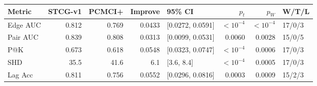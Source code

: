 \begin{tabular}{lrrrlrrl}
\toprule
Metric & STCG-v1 & PCMCI+ & Improve & 95\% CI & $p_t$ & $p_W$ & W/T/L \\
\midrule
Edge AUC & 0.812 & 0.769 & 0.0433 & [0.0272, 0.0591] & $<10^{-4}$ & $<10^{-4}$ & 17/0/3 \\
Pair AUC & 0.839 & 0.808 & 0.0313 & [0.0099, 0.0531] & 0.0060 & 0.0028 & 15/0/5 \\
P@K & 0.673 & 0.618 & 0.0548 & [0.0323, 0.0747] & $<10^{-4}$ & 0.0006 & 17/0/3 \\
SHD & 35.5 & 41.6 & 6.1 & [3.6, 8.4] & $<10^{-4}$ & 0.0005 & 17/0/3 \\
Lag Acc & 0.811 & 0.756 & 0.0552 & [0.0296, 0.0816] & 0.0003 & 0.0009 & 15/2/3 \\
\bottomrule
\end{tabular}
